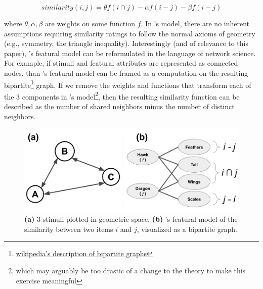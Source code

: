 \documentclass[12pt]{article}
\let\oldtextcite=\textcite
\renewcommand{\textcite}[1]{\textcolor[rgb]{0, .121, .388}{\oldtextcite{#1}}}
\begin{document}
$$ similarity(i,j) = \theta f(i \cap j) - \alpha f(i - j) - \beta f(i - j) $$ 

where \(\theta,\alpha,\beta\) are weights on some function \(f\). In \textcite{tversky1977features}'s model, there are no inherent assumptions requiring similarity ratings to follow the normal axioms of geometry (e.g., symmetry, the triangle inequality). Interestingly (and of relevance to this paper), \textcite{tversky1977features}'s featural model can be reformulated in the language of network science. For example, if stimuli and featural attributes are represented as connected nodes, than \textcite{tversky1977features}'s featural model can be framed as a computation on the resulting bipartite\footnote{\href{https://en.wikipedia.org/wiki/Bipartite_graph}{wikipedia's description of bipartite graphs}} graph. If we remove the weights and functions that transform each of the 3 components in \textcite{tversky1977features}'s model\footnote{which may arguably be too drastic of a change to the theory to make this exercise meaningful}, then the resulting similarity function can be described as the number of shared neighbors minus the number of distinct neighbors. 

\begin{figure}[h]
    \centering
    \label{fig:tversky}
    \includegraphics[scale=.4]{figures/tversky.png}
    \caption{\textbf{(a)} 3 stimuli plotted in geometric space. \textbf{(b)} \textcite{tversky1977features}'s featural model of the similarity between two items \(i\) and \(j\), visualized as a bipartite graph. }
\end{figure}
\end{document}
